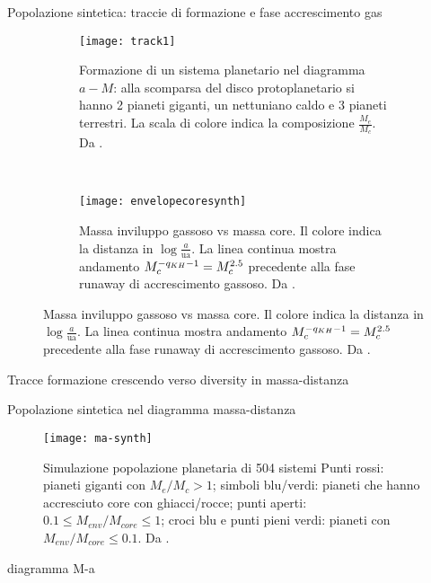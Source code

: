 \begin{frame}{Popolazione sintetica: traccie di formazione e fase accrescimento gas}

\begin{figure}[!ht]
	\begin{subfigure}[b]{0.48\textwidth}
		\centering
		\texttt{[image: track1]}
		\caption{Formazione di un sistema planetario nel diagramma $a-M$: alla scomparsa del disco protoplanetario si hanno 2 pianeti giganti, un nettuniano caldo e 3 pianeti terrestri. La scala di colore indica la composizione $\frac{M_e}{M_c}$. Da \cite{mordasini2018planetary}.}\label{fig:track1}
	\end{subfigure}
	~
	\begin{subfigure}[b]{0.49\textwidth}
		\centering
		\texttt{[image: envelopecoresynth]}
		\caption{Massa inviluppo gassoso vs massa core. Il colore indica la distanza in $\log{\frac{a}{\si{\astronomicalunit}}}$. La linea continua mostra andamento $M_c^{-q_{KH}-1}=M_c^{2.5}$ precedente alla fase runaway di accrescimento gassoso. Da \cite{mordasini2018planetary}. }\label{fig:envelopecoresynth}
	\end{subfigure}
\end{figure}
\end{frame}

\begin{wordonframe}{Tracce formazione}
crescendo verso diversity in massa-distanza
\end{wordonframe}

\begin{frame}{Popolazione sintetica nel diagramma massa-distanza}
\begin{figure}[!ht]
	\texttt{[image: ma-synth]}
	\caption{Simulazione popolazione planetaria di 504 sistemi Punti rossi: pianeti giganti con $M_e/M_c>1$; simboli blu/verdi: pianeti che hanno accresciuto core con ghiacci/rocce; punti aperti: $0.1\leq M_{env}/M_{core}\leq1$; croci blu e punti pieni verdi: pianeti con $M_{env}/M_{core}\leq0.1$. Da \cite{mordasini2018planetary}.}\label{fig:ma-synth}
\end{figure}
\end{frame}

\begin{wordonframe}{diagramma M-a}

\end{wordonframe}


